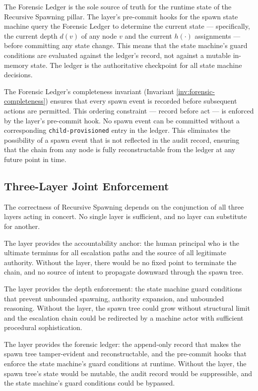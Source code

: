 The Forensic Ledger is the sole source of truth for the runtime state of the
Recursive Spawning pillar.  The \fact{} layer's pre-commit hooks for the spawn
state machine query the Forensic Ledger to determine the current state —
specifically, the current depth $d(v)$ of any node $v$ and the current
$h(\cdot)$ assignments — before committing any state change.  This means that
the state machine's guard conditions are evaluated against the ledger's record,
not against a mutable in-memory state.  The ledger is the authoritative
checkpoint for all state machine decisions.

The Forensic Ledger's completeness invariant (Invariant
\ref{inv:forensic-completeness}) ensures that every spawn event is recorded
before subsequent actions are permitted.  This ordering constraint — record
before act — is enforced by the \fact{} layer's pre-commit hook.  No spawn
event can be committed without a corresponding \texttt{child-provisioned} entry
in the ledger.  This eliminates the possibility of a spawn event that is not
reflected in the audit record, ensuring that the chain from any node is fully
reconstructable from the ledger at any future point in time.

\subsection{Three-Layer Joint Enforcement}
\label{sec:three-layer-joint}

The correctness of Recursive Spawning depends on the conjunction of all three
layers acting in concert.  No single layer is sufficient, and no layer can
substitute for another.

The \purpose{} layer provides the accountability anchor: the human principal who
is the ultimate terminus for all escalation paths and the source of all
legitimate authority.  Without the \purpose{} layer, there would be no fixed
point to terminate the chain, and no source of intent to propagate downward
through the spawn tree.

The \bounds{} layer provides the depth enforcement: the state machine guard
conditions that prevent unbounded spawning, authority expansion, and unbounded
reasoning.  Without the \bounds{} layer, the spawn tree could grow without
structural limit and the escalation chain could be redirected by a machine actor
with sufficient procedural sophistication.

The \fact{} layer provides the forensic ledger: the append-only record that
makes the spawn tree tamper-evident and reconstructable, and the pre-commit
hooks that enforce the state machine's guard conditions at runtime.  Without
the \fact{} layer, the spawn tree's state would be mutable, the audit record
would be suppressible, and the state machine's guard conditions could be
bypassed.

